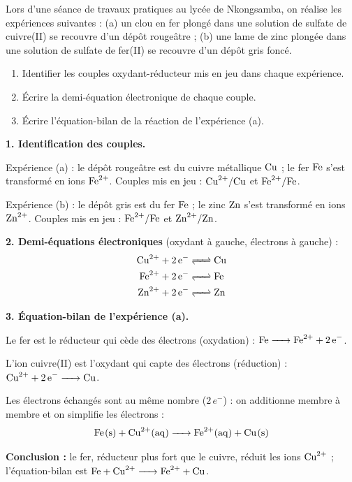 \documentclass[11pt]{article}
\begin{document}
\begin{exoresolu}
Lors d'une séance de travaux pratiques au lycée de Nkongsamba, on réalise les expériences suivantes : (a) un clou en fer plongé dans une solution de sulfate de cuivre(II) se recouvre d'un dépôt rougeâtre ; (b) une lame de zinc plongée dans une solution de sulfate de fer(II) se recouvre d'un dépôt gris foncé.
\begin{enumerate}
\item Identifier les couples oxydant-réducteur mis en jeu dans chaque expérience.
\item Écrire la demi-équation électronique de chaque couple.
\item Écrire l'équation-bilan de la réaction de l'expérience (a).
\end{enumerate}
\tcblower
\textbf{1. Identification des couples.}

Expérience (a) : le dépôt rougeâtre est du cuivre métallique $\ce{Cu}$ ; le fer $\ce{Fe}$ s'est transformé en ions $\ce{Fe^2+}$. Couples mis en jeu : $\ce{Cu^2+}/\ce{Cu}$ et $\ce{Fe^2+}/\ce{Fe}$.

Expérience (b) : le dépôt gris est du fer $\ce{Fe}$ ; le zinc $\ce{Zn}$ s'est transformé en ions $\ce{Zn^2+}$. Couples mis en jeu : $\ce{Fe^2+}/\ce{Fe}$ et $\ce{Zn^2+}/\ce{Zn}$.

\textbf{2. Demi-équations électroniques} (oxydant à gauche, électrons à gauche) :
\begin{align*}
\ce{Cu^2+ + 2e- &<=> Cu} \\
\ce{Fe^2+ + 2e- &<=> Fe} \\
\ce{Zn^2+ + 2e- &<=> Zn}
\end{align*}

\textbf{3. Équation-bilan de l'expérience (a).}

Le fer est le réducteur qui cède des électrons (oxydation) : $\ce{Fe -> Fe^2+ + 2e-}$.

L'ion cuivre(II) est l'oxydant qui capte des électrons (réduction) : $\ce{Cu^2+ + 2e- -> Cu}$.

Les électrons échangés sont au même nombre ($2\,e^-$) : on additionne membre à membre et on simplifie les électrons :
\[ \ce{Fe(s) + Cu^2+(aq) -> Fe^2+(aq) + Cu(s)} \]

\textbf{Conclusion :} le fer, réducteur plus fort que le cuivre, réduit les ions $\ce{Cu^2+}$ ; l'équation-bilan est $\ce{Fe + Cu^2+ -> Fe^2+ + Cu}$.
\end{exoresolu}
\end{document}
